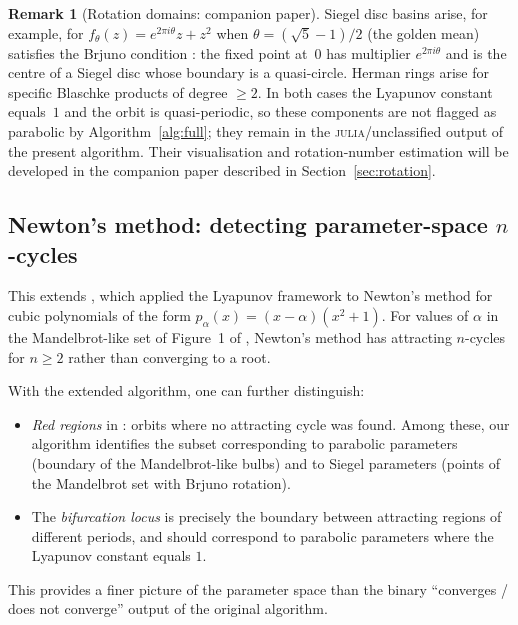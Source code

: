 \documentclass[12pt]{article}
\theoremstyle{definition}
\newtheorem{remark}[theorem]{Remark}
\begin{document}
\begin{remark}[Rotation domains: companion paper]
Siegel disc basins arise, for example, for $f_\theta(z)=e^{2\pi i\theta}z+z^2$
when $\theta=(\sqrt{5}-1)/2$ (the golden mean) satisfies the Brjuno
condition \cite{Siegel1942,Yoccoz1988}: the fixed point at~$0$ has
multiplier $e^{2\pi i\theta}$ and is the centre of a Siegel disc whose
boundary is a quasi-circle.  Herman rings arise for specific Blaschke
products of degree $\ge 2$.  In both cases the Lyapunov constant equals~$1$
and the orbit is quasi-periodic, so these components are not flagged as
parabolic by Algorithm~\ref{alg:full}; they remain in the
\textsc{julia}/unclassified output of the present algorithm.  Their
visualisation and rotation-number estimation will be developed in the
companion paper described in Section~\ref{sec:rotation}.
\end{remark}

\subsection{Newton's method: detecting parameter-space $n$-cycles}

This extends \cite[\S6]{Alvarez2023}, which applied the Lyapunov
framework to Newton's method \cite{Schleicher2004,Shub1993} for cubic polynomials of the form
$p_\alpha(x) = (x-\alpha)(x^2+1)$.  For values of $\alpha$ in the
Mandelbrot-like set of Figure~1 of \cite{Alvarez2023}, Newton's method
has attracting $n$-cycles for $n \ge 2$ rather than converging to a root.

With the extended algorithm, one can further distinguish:
\begin{itemize}
  \item \emph{Red regions} in \cite[Fig.~2--3]{Alvarez2023}: orbits where
        no attracting cycle was found.  Among these, our algorithm
        identifies the subset corresponding to parabolic parameters
        (boundary of the Mandelbrot-like bulbs) and to Siegel parameters
        (points of the Mandelbrot set with Brjuno rotation).
  \item The \emph{bifurcation locus} is precisely the boundary between
        attracting regions of different periods, and should correspond to
        parabolic parameters where the Lyapunov constant equals $1$.
\end{itemize}
This provides a finer picture of the parameter space than the binary
``converges / does not converge'' output of the original algorithm.
\end{document}
